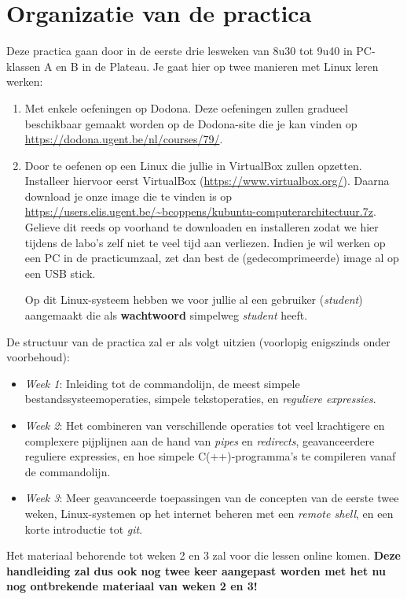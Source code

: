 \documentclass[a4paper,twoside,openany]{memoir}
\begin{document}
\section{Organizatie van de practica}

Deze practica gaan door in de eerste drie lesweken van 8u30 tot 9u40 in PC-klassen A en B in de Plateau. Je gaat hier
op twee manieren met Linux leren werken:

\begin{enumerate}
\item Met enkele oefeningen op Dodona. Deze oefeningen zullen gradueel beschikbaar gemaakt worden op de Dodona-site die je
kan vinden op \url{https://dodona.ugent.be/nl/courses/79/}.
\item Door te oefenen op een Linux die jullie in VirtualBox zullen opzetten. Installeer hiervoor eerst VirtualBox
(\url{https://www.virtualbox.org/}). Daarna download je onze image die te vinden is op 
\url{https://users.elis.ugent.be/~bcoppens/kubuntu-computerarchitectuur.7z}. Gelieve dit reeds op voorhand te downloaden en
installeren zodat we hier tijdens de labo's zelf niet te veel tijd aan verliezen. Indien je wil werken op een PC in de
practicumzaal, zet dan best de (gedecomprimeerde) image al op een USB stick.

Op dit Linux-systeem hebben we voor jullie al een gebruiker (\emph{student}) aangemaakt die als \textbf{wachtwoord} simpelweg
\emph{student} heeft.
\end{enumerate}

De structuur van de practica zal er als volgt uitzien (voorlopig enigszinds onder voorbehoud):
\begin{itemize}
\item \emph{Week 1}: Inleiding tot de commandolijn, de meest simpele bestandssysteemoperaties, simpele tekstoperaties, en \emph{reguliere expressies}.
\item \emph{Week 2}: Het combineren van verschillende operaties tot veel krachtigere en complexere pijplijnen aan de hand van \emph{pipes} en \emph{redirects}, geavanceerdere reguliere expressies, en hoe simpele C(++)-programma's te compileren vanaf de commandolijn.
\item \emph{Week 3}: Meer geavanceerde toepassingen van de concepten van de eerste twee weken, Linux-systemen op het internet beheren met een \emph{remote shell}, en een korte introductie tot \emph{git}.
\end{itemize}

Het materiaal behorende tot weken 2 en 3 zal voor die lessen online komen. \textbf{Deze handleiding zal dus ook nog twee keer aangepast worden met het nu nog ontbrekende materiaal van weken 2 en 3!}
\end{document}
